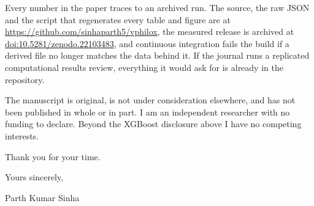 \documentclass[11pt,a4paper]{article}
\begin{document}
Every number in the paper traces to an archived run. The source, the raw JSON
and the script that regenerates every table and figure are at
\url{https://github.com/sinhaparth5/vphilox}, the measured release is archived
at \href{https://doi.org/10.5281/zenodo.22103483}{doi:10.5281/zenodo.22103483},
and continuous integration fails the build if a derived file no longer matches
the data behind it. If the journal runs a replicated computational results
review, everything it would ask for is already in the repository.

The manuscript is original, is not under consideration elsewhere, and has not
been published in whole or in part. I am an independent researcher with no
funding to declare. Beyond the XGBoost disclosure above I have no competing
interests.

Thank you for your time.

\vspace{16pt}

Yours sincerely,

\vspace{22pt}

Parth Kumar Sinha
\end{document}
